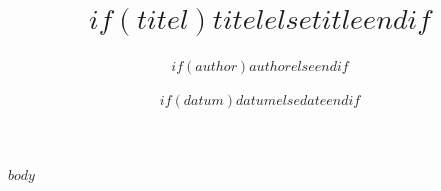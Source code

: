 \documentclass[11pt,a4paper]{article}
\title{$if(titel)$$titel$$else$$title$$endif$}
\author{$if(author)$$author$$else$$endif$}
\date{$if(datum)$$datum$$else$$date$$endif$}
\begin{document}
\maketitle

$body$
\end{document}
